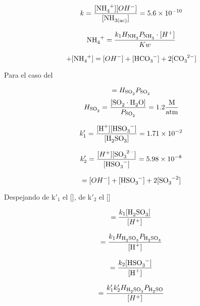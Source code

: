 \begin{equation*}
k =\frac {[\ce{NH4^+}][OH^-]} {[\ce{NH_{3(ac)}}]} = 5.6\times10^{-10}
\end{equation*}

\begin{equation*}
\ce{NH4^+} = \frac{k_1H_{\ce{NH3}}P_{\ce{NH3}}\cdot [H^+]} { Kw} 
\end{equation*}

\begin{equation*}
[H^+] + [\ce{NH4+}] = [OH^-] + [\ce{HCO3-}] +2[\ce{CO3^2-}]
\end{equation*}

Para el caso del 


\begin{equation*}
[\ce{SO2}\cdot\ce{H2O}] = H_{\ce{SO2}} P_{\ce{SO2}}
\end{equation*} 
\begin{equation*}
H_{\ce{SO2}} =\frac{ [\ce{SO2}\cdot\ce{H2O}]} { P_{\ce{SO2}}} = 1.2\frac{\textrm{M}}{\textrm{atm}}
\end{equation*}

\begin{equation*}
k'_1 = \frac{[\ce{H+}][\ce{HSO3^-]}} {[\ce{H2SO3}]} = 1.71\times10^{-2}
\end{equation*}

\begin{equation*}
k'_2 = \frac{[H^+] [\ce{SO3^{2-}}]}{[\ce{HSO3-}]} = 5.98\times10^{-8}
\end{equation*}

\begin{equation*}
[H^+] = [OH^-] + [\ce{HSO3-}] +2[\ce{SO3^{-2}}]
\end{equation*}

Despejando de k$'_1$  el [], de  k$'_2$  el []

\begin{equation*}
[\ce{HSO3-}] =\frac{ k_1[\ce{H2SO3}]} {[H^+]} 
\end{equation*}

\begin{equation*}
[\ce{HSO3-}]= \frac{k_1 H_{\ce{H2SO3}}P_{\ce{H2SO3}}} {[\ce{H+}]}
\end{equation*}

\begin{equation*}
[\ce{SO3^{2-}}] =\frac{k_2[\ce{HSO3-}]} {[\ce{H+}]} 
\end{equation*}

\begin{equation*}
[\ce{SO3^{2-}}]=\frac{k'_1k'_2H_{\ce{H2SO3}}P_{\ce{H2SO}}} {[H^+]}
\end{equation*}

